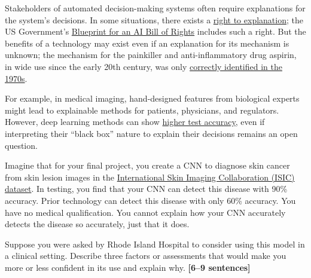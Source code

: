 \documentclass{csci1430}
\begin{document}
\begin{answer}[height=20]

\end{answer}

\pagebreak

\begin{question}[points=12,drawbox=false]
Stakeholders of automated decision-making systems often require explanations for the system's decisions. In some situations, there exists a \href{https://en.wikipedia.org/wiki/Right_to_explanation}{right to explanation}; the US Government's \href{https://www.whitehouse.gov/ostp/ai-bill-of-rights/}{Blueprint for an AI Bill of Rights} includes such a right. But the benefits of a technology may exist even if an explanation for its mechanism is unknown; the mechanism for the painkiller and anti-inflammatory drug aspirin, in wide use since the early 20th century, was only \href{https://en.wikipedia.org/wiki/History_of_aspirin\#Investigating_how_aspirin_works}{correctly identified in the 1970s}.

For example, in medical imaging, hand-designed features from biological experts might lead to explainable methods for patients, physicians, and regulators. However, deep learning methods can show \href{https://drive.google.com/file/d/1bDAqEtW482OJeqMBt5A4AradVa4gf_o9/view}{higher test accuracy}, even if interpreting their ``black box'' nature to explain their decisions remains an open question.

Imagine that for your final project, you create a CNN to diagnose skin cancer from skin lesion images in the \href{https://challenge2020.isic-archive.com/}{International Skin Imaging Collaboration (ISIC) dataset}. In testing, you find that your CNN can detect this disease with 90\% accuracy. Prior technology can detect this disease with only 60\% accuracy. You have no medical qualification. You cannot explain how your CNN accurately detects the disease so accurately, just that it does.
\end{question}

\pagebreak
\begin{subquestion}[points=6]
Suppose you were asked by Rhode Island Hospital to consider using this model in a clinical setting. Describe three factors or assessments that would make you more or less confident in its use and explain why. \textbf{[6--9 sentences]}
\end{subquestion}

\begin{answer}[height=30]

\end{answer}
\end{document}
